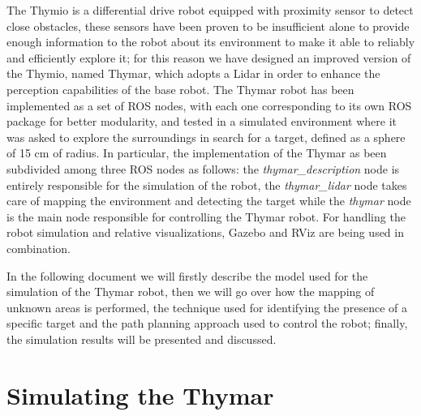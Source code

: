 \documentclass[9pt,conference]{IEEEtran}
\begin{document}
The Thymio is a differential drive robot equipped with proximity sensor to detect close obstacles, these sensors have been proven to be insufficient alone to provide enough information to the robot about its environment to make it able to reliably and efficiently explore it; for this reason we have designed an improved version of the Thymio, named Thymar, which adopts a Lidar in order to enhance the perception capabilities of the base robot. 
The Thymar robot has been implemented as a set of ROS nodes, with each one corresponding to its own ROS package for better modularity, and tested in a simulated environment where it was asked to explore the surroundings in search for a target, defined as a sphere of 15 cm of radius. In particular, the implementation of the Thymar as been subdivided among three ROS nodes as follows: the \emph{thymar\_description} node is entirely responsible for the simulation of the robot, the \emph{thymar\_lidar} node takes care of mapping the environment and detecting the target while the \emph{thymar} node is the main node responsible for controlling the Thymar robot. For handling the robot simulation and relative visualizations, Gazebo \cite{gazebo} and RViz \cite{rviz} are being used in combination.

In the following document we will firstly describe the model used for the simulation of the Thymar robot, then we will go over how the mapping of unknown areas is performed, the technique used for identifying the presence of a specific target and the path planning approach used to control the robot; finally, the simulation results will be presented and discussed. 




\section{Simulating the Thymar}
\end{document}
